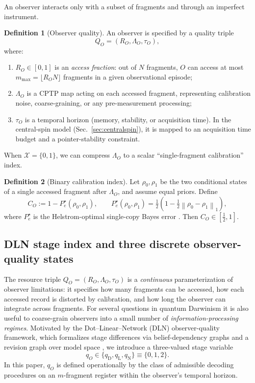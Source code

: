 \documentclass[11pt]{article}
\newcommand{\cX}{\mathcal{X}}
\newcommand{\normone}[1]{\left\lVert #1\right\rVert_{1}}
\newcommand{\1}{\mathbf{1}}
\theoremstyle{definition}
\newtheorem{definition}{Definition}
\theoremstyle{plain}
\begin{document}
An observer interacts only with a subset of fragments and through an imperfect instrument.

\begin{definition}[Observer quality]
An observer is specified by a quality triple
\[
Q_O=(R_O,\Lambda_O,\tau_O),
\]
where:
\begin{enumerate}[leftmargin=2em]
\item $R_O\in[0,1]$ is an \emph{access fraction}: out of $N$ fragments, $O$ can access at most $m_{\max}=\lfloor R_O N\rfloor$ fragments in a given observational episode;
\item $\Lambda_O$ is a CPTP map acting on each accessed fragment, representing calibration noise, coarse-graining, or any pre-measurement processing;
\item $\tau_O$ is a temporal horizon (memory, stability, or acquisition time). In the central-spin model (Sec.~\ref{sec:centralspin}), it is mapped to an acquisition time budget and a pointer-stability constraint.
\end{enumerate}
\end{definition}

When $\cX=\{0,1\}$, we can compress $\Lambda_O$ to a scalar ``single-fragment calibration'' index.

\begin{definition}[Binary calibration index]
Let $\rho_0,\rho_1$ be the two conditional states of a single accessed fragment after $\Lambda_O$, and assume equal priors.
Define
\begin{equation}
C_O:=1-P_e^\star(\rho_0,\rho_1),
\qquad
P_e^\star(\rho_0,\rho_1)=\tfrac12\left(1-\tfrac12\normone{\rho_0-\rho_1}\right),
\label{eq:calibration}
\end{equation}
where $P_e^\star$ is the Helstrom-optimal single-copy Bayes error \citep{Helstrom1976,Watrous2018}.
Then $C_O\in[\tfrac12,1]$.
\end{definition}


\subsection{DLN stage index and three discrete observer-quality states}
\label{sec:qstates}

The resource triple $Q_O=(R_O,\Lambda_O,\tau_O)$ is a \emph{continuous} parameterization of observer limitations: it specifies how many fragments can be accessed, how each accessed record is distorted by calibration, and how long the observer can integrate across fragments.
For several questions in quantum Darwinism it is also useful to coarse-grain observers into a small number of \emph{information-processing regimes}.
Motivated by the Dot--Linear--Network (DLN) observer-quality framework, which formalizes stage differences via belief-dependency graphs and a revision graph over model space \citep{WuDLNCompression2026preprint}, we introduce a three-valued stage variable
\[
q_O \in \{q_{\mathrm{D}},q_{\mathrm{L}},q_{\mathrm{N}}\} \equiv \{0,1,2\}.
\]
In this paper, $q_O$ is defined operationally by the class of admissible decoding procedures on an $m$-fragment register within the observer's temporal horizon.
\end{document}
